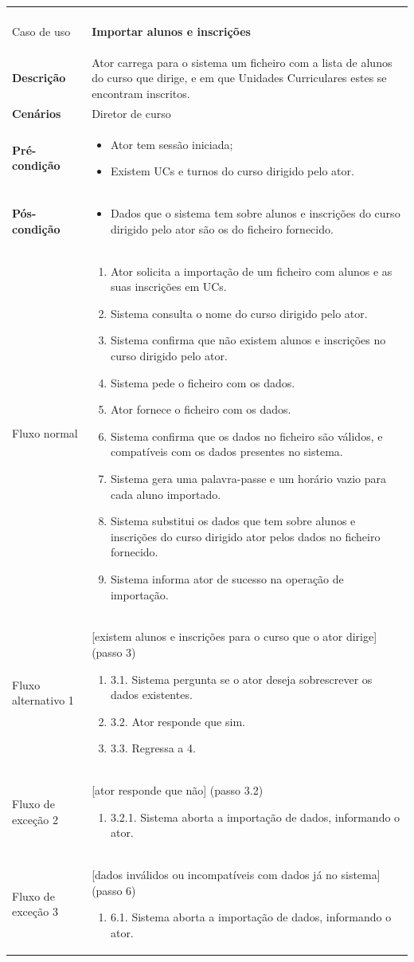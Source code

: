 \documentclass[12pt, a4paper]{article}
\newenvironment{condition}{
    \begin{itemize}[wide=0pt]
        \vspace{-0.2cm}
}{
        \vspace{-0.5cm}
    \end{itemize}
}
\newcommand\flow[1]{
    Fluxo normal &
    \vspace{-0.9cm}
    \singlespacing
    \begin{enumerate}[wide=0pt]
        #1
        \vspace{-0.3cm}
    \end{enumerate} \\ \hline
}
\newcommand\otherflow[3]{
    #1 &
    #2
    \singlespacing
    \begin{enumerate}[wide=0pt]
        #3
        \vspace{-0.3cm}
    \end{enumerate} \\ \hline
}
\newenvironment{usecase}[5]{
    \begin{longtable}{|>{\centering\arraybackslash\bf}m{3cm}|m{13cm}|}
        \multicolumn{2}{c}{\ldots Continua \ldots} \\
        \endfoot
        \endlastfoot

        \hline
        Caso de uso & \textbf{#1} \\

        \hline
        Descrição & #2 \\

        \hline
        Cenários & #3 \\

        \hline
        Pré-condição &
        \vspace{-0.8cm}
        \begin{condition}
            #4
        \end{condition} \\

        \hline
        Pós-condição &
        \vspace{-0.8cm}
        \begin{condition}
            #5
        \end{condition} \\

        \hline
}{
\end{longtable}
}
\begin{document}
\begin{usecase}
    {Importar alunos e inscrições}
    {
        Ator carrega para o sistema um ficheiro com a lista de alunos do curso que dirige, e em que
        Unidades Curriculares estes se encontram inscritos.
    }
    {Diretor de curso}
    {
        \item Ator tem sessão iniciada;
        \item Existem UCs e turnos do curso dirigido pelo ator.
    }
    {
        \item Dados que o sistema tem sobre alunos e inscrições do curso dirigido pelo ator são os
            do ficheiro fornecido.
    }

    \flow{
        \item Ator solicita a importação de um ficheiro com alunos e as suas inscrições em UCs.
        \item Sistema consulta o nome do curso dirigido pelo ator.
        \item Sistema confirma que não existem alunos e inscrições no curso dirigido pelo ator.
        \item Sistema pede o ficheiro com os dados.
        \item Ator fornece o ficheiro com os dados.
        \item Sistema confirma que os dados no ficheiro são válidos, e compatíveis com os dados
            presentes no sistema.
        \item Sistema gera uma palavra-passe e um horário vazio para cada aluno importado.
        \item Sistema substitui os dados que tem sobre alunos e inscrições do curso dirigido ator
            pelos dados no ficheiro fornecido.
        \item Sistema informa ator de sucesso na operação de importação.
    }

    \otherflow{Fluxo alternativo 1}
        {[existem alunos e inscrições para o curso que o ator dirige] (passo 3)}{

        \item[3.1.] Sistema pergunta se o ator deseja sobrescrever os dados existentes.
        \item[3.2.] Ator responde que sim.
        \item[3.3.] Regressa a 4.
    }

    \otherflow{Fluxo de exceção 2}{[ator responde que não] (passo 3.2)}{
        \item[3.2.1.] Sistema aborta a importação de dados, informando o ator.
    }

    \otherflow{Fluxo de exceção 3}
        {[dados inválidos ou incompatíveis com dados já no sistema] (passo 6)}{

        \item[6.1.] Sistema aborta a importação de dados, informando o ator.
    }
\end{usecase}
\end{document}
